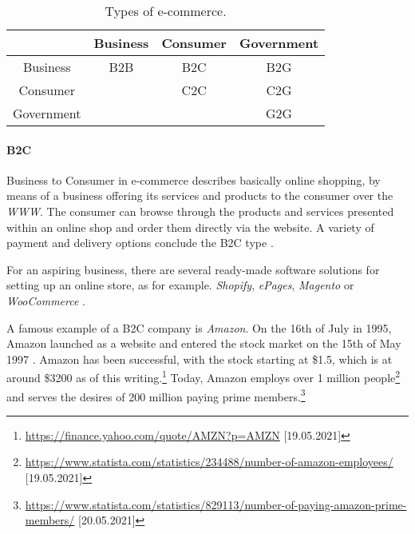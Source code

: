 \begin{table}[h]
	\small
	\centering
	\begin{tabular}{| c | c | c | c |}
	\hline
	 & Business & Consumer & Government \\
	\hline
	Business & B2B & B2C & B2G \\
	\hline
	Consumer & \cellcolor{lightgrey} & C2C & C2G \\
	\hline
	Government & \cellcolor{lightgrey} & \cellcolor{lightgrey} & G2G \\
	\hline
	\end{tabular}
	\medskip
	\caption{Types of e-commerce.}
	\label{table:types_ecommerce}
\end{table}


\paragraph{B2C} %

Business to Consumer in e-commerce describes basically online shopping, by means of a business offering its services and products to the consumer over the \textit{WWW}.
The consumer can browse through the products and services presented within an online shop and order them directly via the website.
A variety of payment and delivery options conclude the B2C type \cite{2020Heinemann}.

For an aspiring business, there are several ready-made software solutions for setting up an online store, as for example. \textit{Shopify}, \textit{ePages}, \textit{Magento} or \textit{WooCommerce} \cite{2019Steireif}.

A famous example of a B2C company is \textit{Amazon}.
On the 16th of July in 1995, Amazon launched as a website and entered the stock market on the 15th of May 1997 \cite{2019Stone}. %
Amazon has been successful, with the stock starting at \$1.5, which is at around \$3200 as of this writing.\footnote{\url{https://finance.yahoo.com/quote/AMZN?p=AMZN} [19.05.2021]}
Today, Amazon employs over 1 million people\footnote{\url{https://www.statista.com/statistics/234488/number-of-amazon-employees/} [19.05.2021]} and serves the desires of 200 million paying prime members.\footnote{\url{https://www.statista.com/statistics/829113/number-of-paying-amazon-prime-members/} [20.05.2021]}
\\


